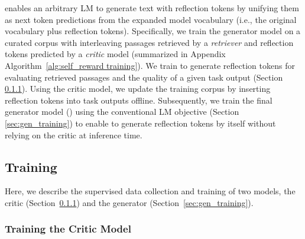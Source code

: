 \model enables an arbitrary LM to generate text with reflection tokens by unifying them as next token predictions from the expanded model vocabulary (i.e., the original vocabulary plus reflection tokens). Specifically, we train the generator model \mgen on a curated corpus with interleaving passages retrieved by a {\it retriever} \mret and reflection tokens predicted by a {\it critic} model \mcrt (summarized in Appendix  Algorithm~\ref{alg:self_reward training}). We train \mcrt to generate reflection tokens for evaluating retrieved passages and the quality of a given task output (Section \ref{sec:critic_trainig}). 
Using the critic model, we update the training corpus by inserting reflection tokens into task outputs offline.  
Subsequently, we train the final generator model (\mgen) using the conventional LM objective (Section \ref{sec:gen_training}) to enable \mgen to generate reflection tokens by itself without relying on the critic at inference time. 

\subsection{\model Training}
Here,  we describe the supervised data collection and training of two models, the critic \mcrt 
(Section~\ref{sec:critic_trainig}) and the generator \mgen (Section~\ref{sec:gen_training}). 




\subsubsection{Training the Critic Model}
\label{sec:critic_trainig}

